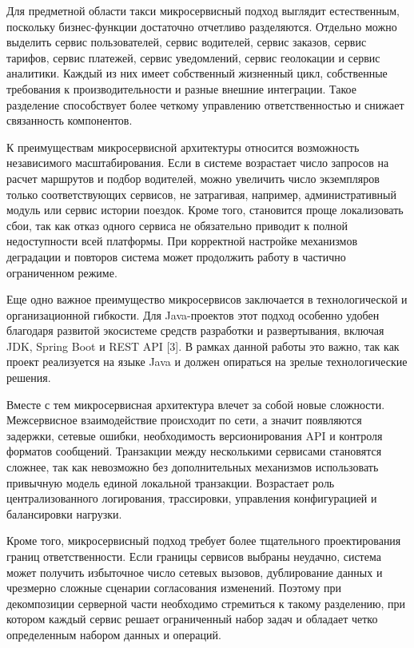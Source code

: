 {\par \redline Для предметной области такси микросервисный подход выглядит естественным, поскольку бизнес-функции достаточно отчетливо разделяются. Отдельно можно выделить сервис пользователей, сервис водителей, сервис заказов, сервис тарифов, сервис платежей, сервис уведомлений, сервис геолокации и сервис аналитики. Каждый из них имеет собственный жизненный цикл, собственные требования к производительности и разные внешние интеграции. Такое разделение способствует более четкому управлению ответственностью и снижает связанность компонентов.

\par \redline К преимуществам микросервисной архитектуры относится возможность независимого масштабирования. Если в системе возрастает число запросов на расчет маршрутов и подбор водителей, можно увеличить число экземпляров только соответствующих сервисов, не затрагивая, например, административный модуль или сервис истории поездок. Кроме того, становится проще локализовать сбои, так как отказ одного сервиса не обязательно приводит к полной недоступности всей платформы. При корректной настройке механизмов деградации и повторов система может продолжить работу в частично ограниченном режиме.

\par \redline Еще одно важное преимущество микросервисов заключается в технологической и организационной гибкости. Для Java-проектов этот подход особенно удобен благодаря развитой экосистеме средств разработки и развертывания, включая JDK, Spring Boot и REST API [3]. В рамках данной работы это важно, так как проект реализуется на языке Java и должен опираться на зрелые технологические решения.
	
\par \redline Вместе с тем микросервисная архитектура влечет за собой новые сложности. Межсервисное взаимодействие происходит по сети, а значит появляются задержки, сетевые ошибки, необходимость версионирования API и контроля форматов сообщений. Транзакции между несколькими сервисами становятся сложнее, так как невозможно без дополнительных механизмов использовать привычную модель единой локальной транзакции. Возрастает роль централизованного логирования, трассировки, управления конфигурацией и балансировки нагрузки.

\par \redline Кроме того, микросервисный подход требует более тщательного проектирования границ ответственности. Если границы сервисов выбраны неудачно, система может получить избыточное число сетевых вызовов, дублирование данных и чрезмерно сложные сценарии согласования изменений. Поэтому при декомпозиции серверной части необходимо стремиться к такому разделению, при котором каждый сервис решает ограниченный набор задач и обладает четко определенным набором данных и операций.

}
